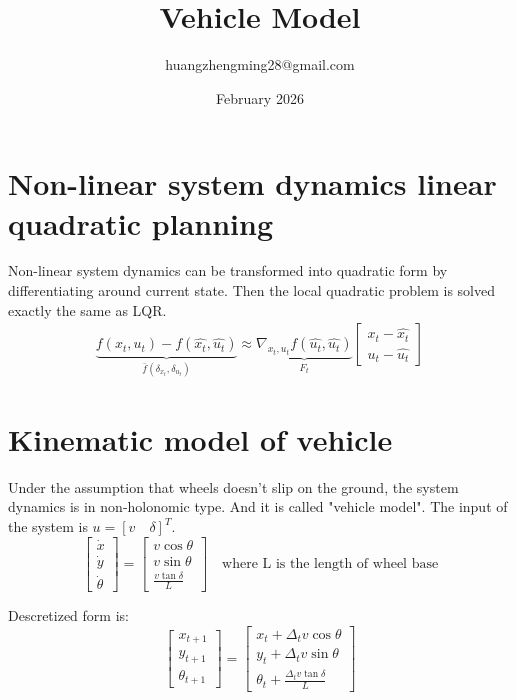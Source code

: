 \documentclass{article}
\title{Vehicle Model}
\author{huangzhengming28@gmail.com}
\date{February 2026}
\begin{document}
\section{Non-linear system dynamics linear quadratic planning}
Non-linear system dynamics can be transformed into quadratic form by differentiating around current state. Then the local quadratic problem is solved exactly the same as LQR.
\begin{gather}
    \underbrace{f(x_t, u_t) - f(\hat{x_t}, \hat{u_t})}_{\bar{f}(\delta_{x_t}, \delta_{u_t})} \approx \underbrace{\nabla_{x_t, u_t} f(\hat{u_t}, \hat{u_t})}_{F_t} \begin{bmatrix}
        x_t - \hat{x_t} \\ u_t - \hat{u_t}
    \end{bmatrix} \label{diff-dynamics}
\end{gather}

\section{Kinematic model of vehicle}
Under the assumption that wheels doesn't slip on the ground, the system dynamics is in non-holonomic type. And it is called "vehicle model". The input of the system is $u=[v \quad \delta]^T$.
\begin{equation}
    \begin{bmatrix}
        \dot x\\ \dot y\\ \dot \theta
    \end{bmatrix} = \begin{bmatrix}
        v\cos{\theta}\\
        v\sin{\theta}\\
        \frac{v\tan{\delta}}{L}
    \end{bmatrix} \quad \text{where L is the length of wheel base}
\end{equation}

Descretized form is:
\begin{equation}
    \begin{bmatrix}
        x_{t + 1}\\ y_{t + 1}\\ \theta_{t + 1}
    \end{bmatrix} = \begin{bmatrix}
        x_t + \Delta_t v\cos{\theta}\\
        y_t + \Delta_t v\sin{\theta}\\
        \theta_t + \frac{\Delta_t v\tan{\delta}}{L}
    \end{bmatrix} \label{descret-kinematic-dynamics}
\end{equation}
\end{document}
